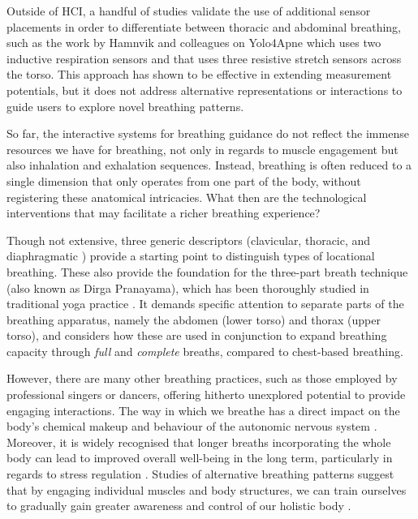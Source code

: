 Outside of HCI, a handful of studies validate the use of additional sensor placements in order to differentiate between thoracic and abdominal breathing, such as the work by Hamnvik and colleagues on Yolo4Apne \cite{hamnvik_yolo4apnea_2020} which uses two inductive respiration sensors and \cite{ejupi_detection_2018} that uses three resistive stretch sensors across the torso. This approach has shown to be effective in extending measurement potentials, but it does not address alternative representations or interactions to guide users to explore novel breathing patterns.

So far, the interactive systems for breathing guidance do not reflect the immense resources we have for breathing, not only in regards to muscle engagement but also inhalation and exhalation sequences. Instead, breathing is often reduced to a single dimension that only operates from one part of the body, without registering these anatomical intricacies. What then are the technological interventions that may facilitate a richer breathing experience?

Though not extensive, three generic descriptors (clavicular, thoracic, and diaphragmatic \cite{rama_science_1998}) provide a starting point to distinguish types of locational breathing. These also provide the foundation for the three-part breath technique (also known as Dirga Pranayama), which has been thoroughly studied in traditional yoga practice \cite{sengupta_health_2012}. It demands specific attention to separate parts of the breathing apparatus, namely the abdomen (lower torso) and thorax (upper torso), and considers how these are used in conjunction to expand breathing capacity through \textit{full} and \textit{complete} breaths, compared to chest-based breathing.

However, there are many other breathing practices, such as those employed by professional singers or dancers, offering hitherto unexplored potential to provide engaging interactions. The way in which we breathe has a direct impact on the body's chemical makeup and behaviour of the autonomic nervous system \cite{russo_physiological_2017}. Moreover, it is widely recognised that longer breaths incorporating the whole body can lead to improved overall well-being in the long term, particularly in regards to stress regulation \cite{moraveji_peripheral_2011}. Studies of alternative breathing patterns suggest that by engaging individual muscles and body structures, we can train ourselves to gradually gain greater awareness and control of our holistic body \cite{van_dixhoorn_whole_2007}.

